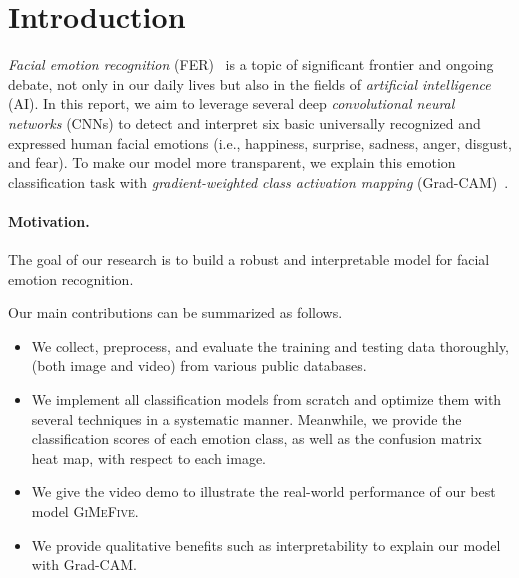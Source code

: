 \section{Introduction}
\label{sec:intro}

\textit{Facial emotion recognition} (FER)~\cite{Ko18,JainSS19,YinTLS019,PhamVT20,Malik0R21} 
is a topic of significant frontier and ongoing debate, 
not only in our daily lives but also in the fields of \textit{artificial intelligence} (AI).
In this report, we aim to leverage several deep 
\textit{convolutional neural networks} (CNNs) to detect and interpret six basic universally recognized and expressed human facial emotions 
(i.e., happiness, surprise, sadness, anger, disgust, and fear). 
To make our model more transparent, 
we explain this emotion classification task with \textit{gradient-weighted class activation mapping} 
(Grad-CAM)~\cite{SelvarajuCDVPB17}. 

\paragraph{Motivation.} %
The goal of our research is to build a robust and interpretable model for facial emotion recognition.

Our main contributions can be summarized as follows.
\begin{itemize}
  \item We collect, preprocess, and evaluate the training and testing data thoroughly, 
  (both image and video) from various public databases. 
  \item We implement all classification models from scratch and optimize them with several techniques in a systematic manner. 
  Meanwhile, we provide the classification scores of each emotion class, 
  as well as the confusion matrix heat map, with respect to each image. 
  \item We give the video demo to illustrate the real-world performance of our best model \textsc{GiMeFive}. 
  \item We provide qualitative benefits such as interpretability to explain our model with Grad-CAM. %
\end{itemize}

